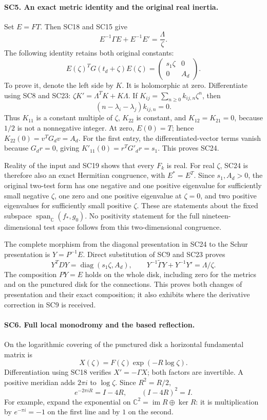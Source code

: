 \paragraph{SC5. An exact metric identity and the original real inertia.}
Set \(E=FT\). Then SC18 and SC15 give
\[
 E^{-1}\Gamma E+E^{-1}E'=\frac{\Lambda}{\zeta}.
 \tag{SC23}
\]
The following identity retains both original constants:
\[
 E(\zeta)^T G(t_d+\zeta)E(\zeta)
   =\begin{pmatrix}s_1\zeta&0\\0&A_d\end{pmatrix}.
 \tag{SC24}
\]
To prove it, denote the left side by \(K\).
It is holomorphic at zero. Differentiate using SC8 and SC23:
\(\zeta K'=\Lambda^TK+K\Lambda\).
If \(K_{ij}=\sum_{n\ge0}k_{ij,n}\zeta^n\), then
\[
 (n-\lambda_i-\lambda_j)k_{ij,n}=0.
\]
Thus \(K_{11}\) is a constant multiple of \(\zeta\),
\(K_{22}\) is constant, and \(K_{12}=K_{21}=0\), because
\(1/2\) is not a nonnegative integer. At zero,
\(E(0)=T\); hence \(K_{22}(0)=v^TG_dv=A_d\).
For the first entry, the differentiated-vector terms vanish
because \(G_dr=0\), giving \(K'_{11}(0)=r^TG'_dr=s_1\).
This proves SC24.

Reality of the input and SC19 shows that every \(F_k\) is real.
For real \(\zeta\), SC24 is therefore also an exact Hermitian
congruence, with \(E^*=E^T\). Since \(s_1,A_d>0\), the
original two-test form has one negative and one positive
eigenvalue for sufficiently small negative \(\zeta\), one
zero and one positive eigenvalue at \(\zeta=0\), and two
positive eigenvalues for sufficiently small positive \(\zeta\).
These are statements about the fixed subspace
\(\operatorname{span}_{\mathbb C}(f_*,g_0)\). No positivity
statement for the full nineteen-dimensional test space follows
from this two-dimensional congruence.

The complete morphism from the diagonal presentation in SC24
to the Schur presentation is \(Y=P^{-1}E\). Direct substitution
of SC9 and SC23 proves
\[
 Y^TDY=\operatorname{diag}(s_1\zeta,A_d),\qquad
 Y^{-1}\widetilde\Gamma Y+Y^{-1}Y'=\Lambda/\zeta.
 \tag{SC25}
\]
The composition \(PY=E\) holds on the whole disk, including zero
for the metrics and on the punctured disk for the connections.
This proves both changes of presentation and their exact
composition; it also exhibits where the derivative correction
in SC9 is received.

\paragraph{SC6. Full local monodromy and the based reflection.}
On the logarithmic covering of the punctured disk a horizontal
fundamental matrix is
\[
 X(\zeta)=F(\zeta)\exp(-R\log\zeta).
 \tag{SC26}
\]
Differentiation using SC18 verifies \(X'=-\Gamma X\);
both factors are invertible. A positive meridian adds \(2\pi i\)
to \(\log\zeta\). Since \(R^2=R/2\),
\[
 e^{-2\pi iR}=I-4R,\qquad (I-4R)^2=I.
 \tag{SC27}
\]
For example, expand the exponential on
\(\mathbb C^2=\operatorname{im}R\oplus\ker R\):
it is multiplication by \(e^{-\pi i}=-1\) on the first
line and by \(1\) on the second.

